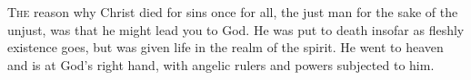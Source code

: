 
\lettrine{T}{he} reason why Christ died for sins once for all, the just man for the sake of the unjust, was that he might lead you to God. He was put to death insofar as fleshly existence goes, but was given life in the realm of the spirit. He went to heaven and is at God’s right hand, with angelic rulers and powers subjected to him.